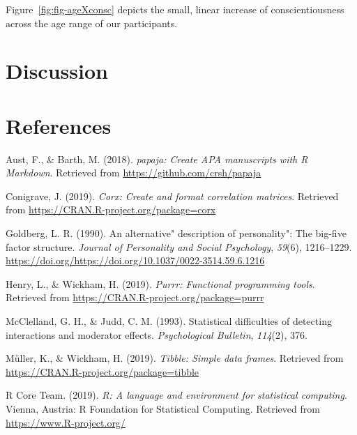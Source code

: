 \documentclass[
  english,
  man,floatsintext]{apa6}
\begin{document}
Figure~\ref{fig:fig-ageXconsc} depicts the small, linear increase of conscientiousness across the age range of our participants.

\hypertarget{discussion}{%
\section{Discussion}\label{discussion}}

\newpage

\hypertarget{references}{%
\section{References}\label{references}}

\begingroup
\setlength{\parindent}{-0.5in}
\setlength{\leftskip}{0.5in}

\hypertarget{refs}{}
\leavevmode\hypertarget{ref-R-papaja}{}%
Aust, F., \& Barth, M. (2018). \emph{papaja: Create APA manuscripts with R Markdown}. Retrieved from \url{https://github.com/crsh/papaja}

\leavevmode\hypertarget{ref-R-corx}{}%
Conigrave, J. (2019). \emph{Corx: Create and format correlation matrices}. Retrieved from \url{https://CRAN.R-project.org/package=corx}

\leavevmode\hypertarget{ref-goldberg1990alternative}{}%
Goldberg, L. R. (1990). An alternative" description of personality": The big-five factor structure. \emph{Journal of Personality and Social Psychology}, \emph{59}(6), 1216--1229. \url{https://doi.org/https://doi.org/10.1037/0022-3514.59.6.1216}

\leavevmode\hypertarget{ref-R-purrr}{}%
Henry, L., \& Wickham, H. (2019). \emph{Purrr: Functional programming tools}. Retrieved from \url{https://CRAN.R-project.org/package=purrr}

\leavevmode\hypertarget{ref-mcclelland1993statistical}{}%
McClelland, G. H., \& Judd, C. M. (1993). Statistical difficulties of detecting interactions and moderator effects. \emph{Psychological Bulletin}, \emph{114}(2), 376.

\leavevmode\hypertarget{ref-R-tibble}{}%
Müller, K., \& Wickham, H. (2019). \emph{Tibble: Simple data frames}. Retrieved from \url{https://CRAN.R-project.org/package=tibble}

\leavevmode\hypertarget{ref-R-base}{}%
R Core Team. (2019). \emph{R: A language and environment for statistical computing}. Vienna, Austria: R Foundation for Statistical Computing. Retrieved from \url{https://www.R-project.org/}
\end{document}
